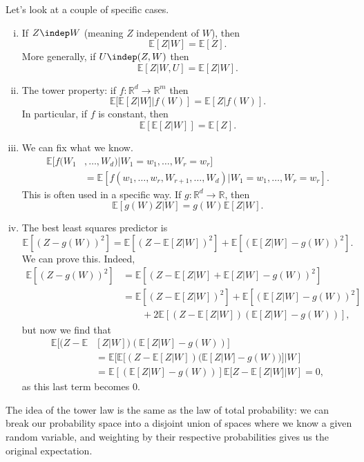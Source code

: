 \documentclass[12pt]{article}
\begin{document}

Let's look at a couple of specific cases.
\begin{enumerate}[(i)]
	\item If $Z \indep W$ (meaning $Z$ independent of $W$), then
		\[
		\mathbb{E}[Z|W] = \mathbb{E}[Z].
		\]
		More generally, if $U \indep (Z, W)$ then
		\[
		\mathbb{E}[Z|W, U] = \mathbb{E}[Z|W].
		\]
	\item The tower property: if $f : \mathbb{R}^d \to \mathbb{R}^m$ then
		\[
		\mathbb{E}[\mathbb{E}[Z|W]|f(W)] = \mathbb{E}[Z|f(W)].
		\]
		In particular, if $f$ is constant, then
		\[
		\mathbb{E}[\mathbb{E}[Z|W]] = \mathbb{E}[Z].
		\]
	\item We can fix what we know.
		\begin{align*}
			\mathbb{E}[f(W_1&, \ldots, W_d) | W_1 = w_1, \ldots, W_r = w_r] \\
							 &= \mathbb{E}[f(w_1, \ldots, w_r, W_{r+1}, \ldots, W_d)|W_1 = w_1, \ldots, W_r = w_r].
		\end{align*}
		This is often used in a specific way. If $g : \mathbb{R}^d \to \mathbb{R}$, then
		\[
		\mathbb{E}[g(W) Z|W] = g(W) \mathbb{E}[Z|W].
		\]
	\item The best least squares predictor is
		\[
		\mathbb{E}[(Z - g(W))^2] = \mathbb{E}[(Z - \mathbb{E}[Z|W])^2] + \mathbb{E}[(\mathbb{E}[Z|W] - g(W))^2].
		\]
		We can prove this. Indeed,
		\begin{align*}
			\mathbb{E}[(Z - g(W))^2] &= \mathbb{E}[(Z - \mathbb{E}[Z|W] + \mathbb{E}[Z|W] - g(W))^2] \\
						 &= \mathbb{E}[(Z - \mathbb{E}[Z|W])^2] + \mathbb{E}[(\mathbb{E}[Z|W] - g(W))^2] \\
						 & \qquad + 2 \mathbb{E}[(Z - \mathbb{E}[Z|W])(\mathbb{E}[Z|W] - g(W))],
		\end{align*}
		but now we find that
		\begin{align*}
			\mathbb{E}[(Z - \mathbb{E}&[Z|W])(\mathbb{E}[Z|W] - g(W))] \\
			&= \mathbb{E}[\mathbb{E}[(Z - \mathbb{E}[Z|W])(\mathbb{E}[Z|W] - g(W))]|W] \\
										  &= \mathbb{E}[(\mathbb{E}[Z|W] - g(W))] \mathbb{E}[Z - \mathbb{E}[Z|W] | W] = 0,
		\end{align*}
		as this last term becomes 0.
\end{enumerate}

The idea of the tower law is the same as the law of total probability: we can break our probability space into a disjoint union of spaces where we know a given random variable, and weighting by their respective probabilities gives us the original expectation.
\end{document}
